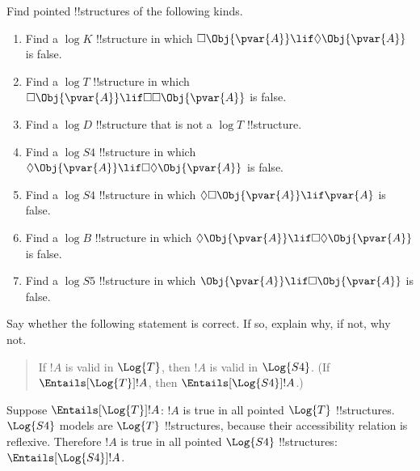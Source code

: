 \documentclass[../../../include/open-logic-section]{subfiles}
\begin{document}


\begin{prob}
    \citep[exercise 3.1 items 1-7]{MacFarlane-2020-PhilosophicalLogicContemporary}
    Find pointed !!{structure}s of the following kinds. 
    \begin{enumerate}
        \item Find a $\log{K}$ !!{structure} in which
        $\Box\Obj{\pvar{A}}\lif\Diamond\Obj{\pvar{A}}$ is false.
        \item Find a $\log{T}$ !!{structure} in which
        $\Box\Obj{\pvar{A}}\lif\Box\Box\Obj{\pvar{A}}$ is false.
        \item Find a $\log{D}$ !!{structure} that is not a $\log{T}$
        !!{structure}.
        \item Find a $\log{S4}$ !!{structure} in which 
        $\Diamond\Obj{\pvar{A}}\lif\Box\Diamond\Obj{\pvar{A}}$ is false.
        \item Find a $\log{S4}$ !!{structure} in which 
        $\Diamond\Box\Obj{\pvar{A}}\lif\pvar{A}$ is false.
        \item Find a $\log{B}$ !!{structure} in which 
        $\Diamond\Obj{\pvar{A}}\lif\Box\Diamond\Obj{\pvar{A}}$ is false.
        \item Find a $\log{S5}$ !!{structure} in which
        $\Obj{\pvar{A}}\lif\Box\Obj{\pvar{A}}$ is false.
    \end{enumerate}
    
\end{prob}


\begin{prob}
    Say whether the following statement is correct. If so, explain why,
    if not, why not. 
    \begin{quote}
       If $!A$ is valid in $\Log{T}$, then $!A$ is valid in $\Log{S4}$. 
        (If $\Entails[\Log{T}]!A$, then $\Entails[\Log{S4}]!A$.)
    \end{quote}

    \begin{ans}
        Suppose $\Entails[\Log{T}]!A$: $!A$ is true in all pointed
        $\Log{T}$ !!{structure}s. $\Log{S4}$ models are $\Log{T}$
        !!{structure}s, because their accessibility relation is
        reflexive. Therefore $!A$ is true in all pointed $\Log{S4}$
        !!{structure}s: $\Entails[\Log{S4}]!A$.
    \end{ans}

\end{prob}
\end{document}
